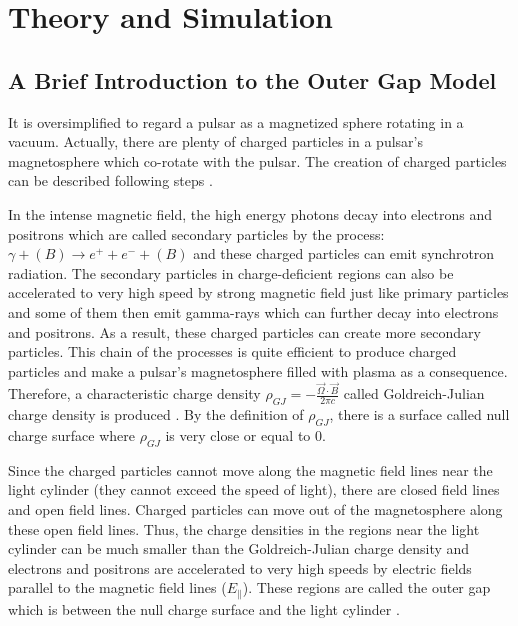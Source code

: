 \documentclass[a4paper, 12pt]{report}
\newcommand{\gj}[0]{
  Goldreich-Julian charge density
}
\begin{document}
    
  
        
\chapter{Theory and Simulation}
  \section{A Brief Introduction to the Outer Gap Model}
    It is oversimplified to regard a pulsar as a magnetized sphere rotating in a vacuum. 
    Actually, there are plenty of charged particles in a pulsar's magnetosphere 
    which co-rotate with the pulsar. The creation of charged particles can 
    be described following steps \cite{Sturrock:1971zc}.

    In the intense magnetic field, the high energy photons decay into electrons and 
    positrons which are called secondary particles by the process: 
    $\gamma + (B) \rightarrow e^++e^-+(B)$ and these charged particles can emit 
    synchrotron radiation. The secondary particles in charge-deficient regions can also 
    be accelerated to very high speed by strong magnetic field just like primary particles 
    and some of them then emit gamma-rays which can further decay into electrons and 
    positrons. As a result, these charged particles can create more secondary particles.
    This chain of the processes is quite efficient to produce charged particles and 
    make a pulsar's magnetosphere filled with plasma as a consequence. Therefore, a 
    characteristic charge density $\rho_{GJ}=-\frac{\vec{\Omega}\cdot \vec{B}}{2\pi c}$ 
    called Goldreich-Julian charge density is produced \cite{1969ApJ}.
    By the definition of $\rho_{GJ}$, there is a surface called null charge surface where 
    $\rho_{GJ}$ is very close or equal to $0$. 

    Since the charged particles cannot move along the magnetic field lines near 
    the light cylinder (they cannot exceed the speed of light), there are closed field 
    lines and open field lines. Charged particles can move out of the magnetosphere along 
    these open field lines. Thus, the charge densities in the regions near the light cylinder
    can be much smaller than the \gj{} and electrons and positrons are accelerated to very high 
    speeds by electric fields parallel to the magnetic field lines ($E_{\parallel}$). 
    These regions are called the outer gap which is between the null charge surface and the 
    light cylinder \cite{1986ApJ...300..500C}.
    
\end{document}

